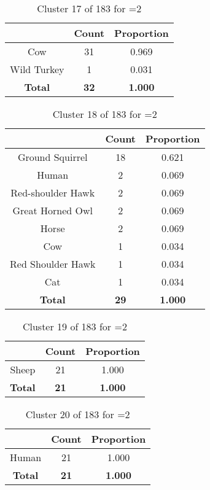 \begin{table}[ht!]
\centering
\begin{tabular}{|c|c|c|}
\hline
\bf \Spec{} &\bf Count &\bf Proportion\\ \hline \hline
Cow & 31 & 0.969\\ \hline
Wild Turkey & 1 & 0.031\\ \hline
\hline
\bf Total & \bf 32 & \bf 1.000\\ \hline
\end{tabular}
\label{tab:cluster:17:2}
\caption{Cluster 17 of 183 for \minneigh{}=2}
\end{table}

\begin{table}[ht!]
\centering
\begin{tabular}{|c|c|c|}
\hline
\bf \Spec{} &\bf Count &\bf Proportion\\ \hline \hline
Ground Squirrel & 18 & 0.621\\ \hline
Human & 2 & 0.069\\ \hline
Red-shoulder Hawk & 2 & 0.069\\ \hline
Great Horned Owl & 2 & 0.069\\ \hline
Horse & 2 & 0.069\\ \hline
Cow & 1 & 0.034\\ \hline
Red Shoulder Hawk & 1 & 0.034\\ \hline
Cat & 1 & 0.034\\ \hline
\hline
\bf Total & \bf 29 & \bf 1.000\\ \hline
\end{tabular}
\label{tab:cluster:18:2}
\caption{Cluster 18 of 183 for \minneigh{}=2}
\end{table}

\begin{table}[ht!]
\centering
\begin{tabular}{|c|c|c|}
\hline
\bf \Spec{} &\bf Count &\bf Proportion\\ \hline \hline
Sheep & 21 & 1.000\\ \hline
\hline
\bf Total & \bf 21 & \bf 1.000\\ \hline
\end{tabular}
\label{tab:cluster:19:2}
\caption{Cluster 19 of 183 for \minneigh{}=2}
\end{table}

\clearpage
\begin{table}[ht!]
\centering
\begin{tabular}{|c|c|c|}
\hline
\bf \Spec{} &\bf Count &\bf Proportion\\ \hline \hline
Human & 21 & 1.000\\ \hline
\hline
\bf Total & \bf 21 & \bf 1.000\\ \hline
\end{tabular}
\label{tab:cluster:20:2}
\caption{Cluster 20 of 183 for \minneigh{}=2}
\end{table}

